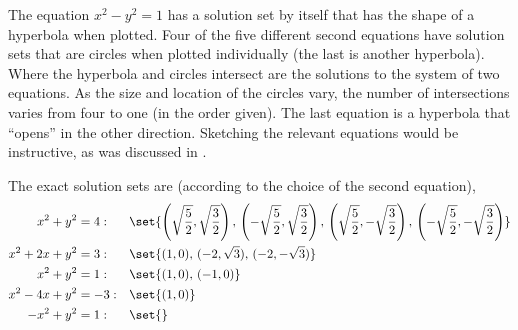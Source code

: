 The equation $x^2-y^2=1$ has a solution set by itself that has the shape of a hyperbola when plotted.  Four of the  five different second equations have solution sets that are circles when plotted individually (the last is another hyperbola).  Where the hyperbola and circles intersect are the solutions to the system of two equations.  As the size and location of the circles vary, the number of intersections varies from four to one (in the order given).  The last equation is a hyperbola that ``opens'' in the other direction.  Sketching the relevant equations would be instructive, as was discussed in .\par
%
The exact solution sets are (according to the choice of the second equation),
%
\begin{align*}
x^2+y^2&=4:
&&
\set{\left(\sqrt{\frac{5}{2}},\sqrt{\frac{3}{2}}\right),\,\left(-\sqrt{\frac{5}{2}},\sqrt{\frac{3}{2}}\right),\,\left(\sqrt{\frac{5}{2}},-\sqrt{\frac{3}{2}}\right),\,\left(-\sqrt{\frac{5}{2}},-\sqrt{\frac{3}{2}}\right)}\\
%
x^2+2x+y^2&=3:
&&
\set{(1,0),\,(-2,\sqrt{3}),\,(-2,-\sqrt{3})}\\
%
x^2+y^2&=1:
&&
\set{(1,0),\,(-1,0)}\\
%
x^2-4x+y^2&=-3:
&&
\set{(1,0)}\\
%
-x^2+y^2&=1:
&&
\set{}
\end{align*}
